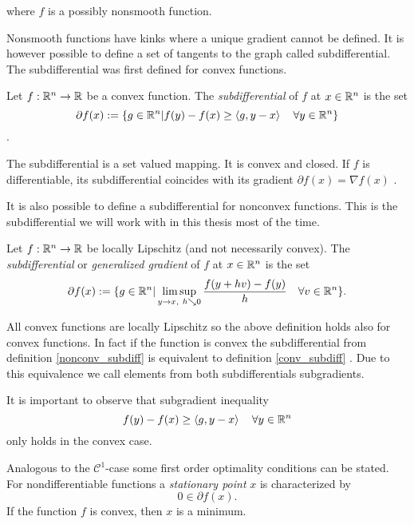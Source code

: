 where \(f\) is a possibly nonsmooth function.


Nonsmooth functions have kinks where a unique gradient cannot be defined. It is however possible to define a set of tangents to the graph called subdifferential.
The subdifferential was first defined for convex functions.

\begin{definition}
\label{conv_subdiff}
	Let \(f: \mathbb{R}^n \to \mathbb{R} \) be a convex function. The \emph{subdifferential} of \(f\) at \(x\in \mathbb{R}^n\) is the set 
	\[ \partial f(x) := \{g \in \mathbb{R}^n| f(y)-f(x) \geq \left\langle g,y-x \right\rangle \quad \forall y \in \mathbb{R}^n\} \].
\end{definition}

The subdifferential is a set valued mapping. It is convex and closed. If \(f\) is differentiable, its subdifferential coincides with its gradient \(\partial f(x) = {\nabla f(x)}\) \cite{Rockafellar1970}.


It is also possible to define a subdifferential for nonconvex functions. This is the subdifferential we will work with in this thesis most of the time.

\begin{definition}
\label{nonconv_subdiff}
	Let \(f: \mathbb{R}^n \to \mathbb{R}\) be locally Lipschitz (and not necessarily convex).
	The \emph{subdifferential} or \emph{generalized gradient} of \(f\) at \(x \in \mathbb{R}^n\) is the set
\[ \partial f(x) := \{g \in \mathbb{R}^n| \limsup_{y \to x,~ h \searrow 0}\frac{f(y+hv)-f(y)}{h} \quad \forall v \in \mathbb{R}^n\}. \]
\end{definition} 

All convex functions are locally Lipschitz \cite{Hiriart-Urruty1996} so the above definition holds also for convex functions. In fact if the function is convex the subdifferential from definition \ref{nonconv_subdiff} is equivalent to  definition \ref{conv_subdiff} \cite{Clarke1990}.
Due to this equivalence we call elements from both subdifferentials subgradients.

\begin{remark}
	It is important to observe that subgradient inequality 
	\[ f(y)-f(x) \geq \left\langle g,y-x \right\rangle \quad \forall y \in \mathbb{R}^n \]
	only holds in the convex case.
\end{remark}

Analogous to the \(\mathcal{C}^1\)-case some first order optimality conditions can be stated.
For nondifferentiable functions a \emph{stationary point} \(x\) is characterized by 
\[ 0 \in \partial f(x). \]
If the function \(f\) is convex, then \(x\) is a minimum.

